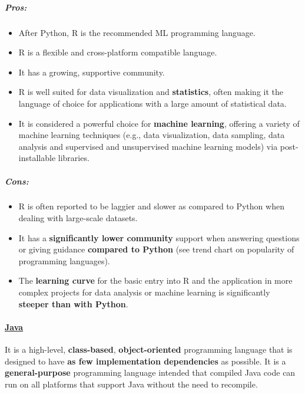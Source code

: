 \documentclass [oneside,10pt,a4paper,ngerman,BCOR10mm,headsepline,parindent,final]{scrartcl}
\providecommand{\tightlist}{%
      \setlength{\itemsep}{0pt}\setlength{\parskip}{0pt}}
\begin{document}
\hypertarget{pros}{%
\subparagraph{Pros:}\label{pros}}

\begin{itemize}
\tightlist
\item
  After Python, R is the recommended ML programming language.
\item
  R is a flexible and cross-platform compatible language.
\item
  It has a growing, supportive community.
\item
  R is well suited for data visualization and \textbf{statistics}, often
  making it the language of choice for applications with a large amount
  of statistical data.
\item
  It is considered a powerful choice for \textbf{machine learning},
  offering a variety of machine learning techniques (e.g., data
  visualization, data sampling, data analysis and supervised and
  unsupervised machine learning models) via post-installable libraries.
\end{itemize}

\hypertarget{cons}{%
\subparagraph{Cons:}\label{cons}}

\begin{itemize}
\tightlist
\item
  R is often reported to be laggier and slower as compared to Python
  when dealing with large-scale datasets.
\item
  It has a \textbf{significantly lower community} support when answering
  questions or giving guidance \textbf{compared to Python} (see trend
  chart on popularity of programming languages).
\item
  The \textbf{learning curve} for the basic entry into R and the
  application in more complex projects for data analysis or machine
  learning is significantly \textbf{steeper than with Python}.
\end{itemize}

    \hypertarget{java}{%
\paragraph{\texorpdfstring{\href{https://en.wikipedia.org/wiki/Java_(programming_language)}{Java}}{Java}}\label{java}}

It is a high-level, \textbf{class-based}, \textbf{object-oriented}
programming language that is designed to have \textbf{as few
implementation dependencies} as possible. It is a
\textbf{general-purpose} programming language intended that compiled
Java code can run on all platforms that support Java without the need to
recompile.
\end{document}
